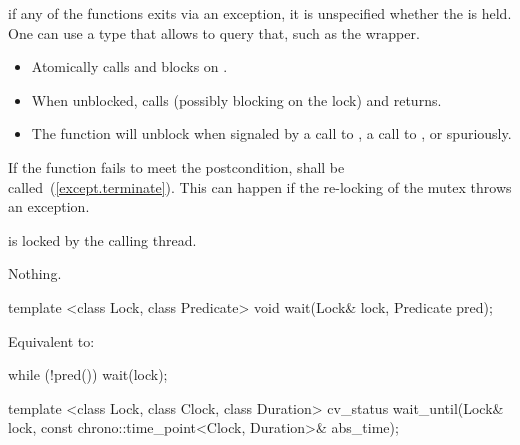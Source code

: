 \begin{itemdescr}
\pnum
\realnote if any of the  functions exits via an exception, it is
unspecified whether the  is held. One can use a  type
that allows to query that, such as the  wrapper.

\pnum
\effects
\begin{itemize}
\item Atomically calls  and blocks on .
\item When unblocked, calls  (possibly blocking on the lock) and returns.
\item The function will unblock when signaled by a call to ,
a call to , or spuriously.
\end{itemize}

\pnum
\notes
If the function fails to meet the postcondition, 
shall be called~(\ref{except.terminate}).
\enternote This can happen if the re-locking of the mutex throws an exception. \exitnote

\pnum\postcondition {} is locked by the calling thread.

\pnum\throws Nothing.

\end{itemdescr}

%
%
\begin{itemdecl}
template <class Lock, class Predicate>
  void wait(Lock& lock, Predicate pred);
\end{itemdecl}

\begin{itemdescr}
\pnum
\effects Equivalent to:
\begin{codeblock}
while (!pred())
  wait(lock);
\end{codeblock}
\end{itemdescr}

%
%
\begin{itemdecl}
template <class Lock, class Clock, class Duration>
  cv_status wait_until(Lock& lock, const chrono::time_point<Clock, Duration>& abs_time);
\end{itemdecl}

